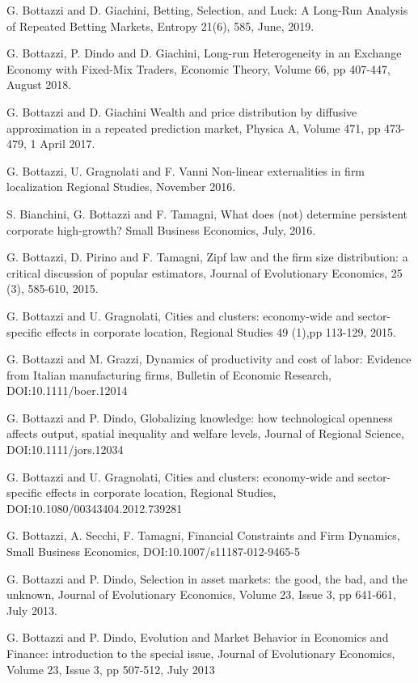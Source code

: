 \documentclass[a4paper]{article}
\begin{document}
G. Bottazzi and D. Giachini, Betting, Selection, and Luck: A Long-Run
Analysis of Repeated Betting Markets, Entropy 21(6), 585, June, 2019.

G. Bottazzi, P. Dindo and D. Giachini, Long-run Heterogeneity in an
Exchange Economy with Fixed-Mix Traders, Economic Theory, Volume 66,
pp 407-447, August 2018.

G. Bottazzi and D. Giachini Wealth and price distribution by diffusive
approximation in a repeated prediction market, Physica A, Volume 471,
pp 473-479, 1 April 2017.

G. Bottazzi, U. Gragnolati and F. Vanni Non-linear externalities in
firm localization Regional Studies, November 2016.

S. Bianchini, G. Bottazzi and F. Tamagni, What does (not) determine
persistent corporate high-growth? Small Business Economics,
July, 2016.

G. Bottazzi, D. Pirino and F. Tamagni, Zipf law and the firm size
distribution: a critical discussion of popular estimators, Journal of
Evolutionary Economics, 25 (3), 585-610, 2015.

G. Bottazzi and U. Gragnolati, Cities and clusters: economy-wide and
sector-specific effects in corporate location, Regional Studies 49
(1),pp 113-129, 2015.

G. Bottazzi and M. Grazzi, Dynamics of productivity and cost of labor:
Evidence from Italian manufacturing firms, Bulletin of Economic
Research, DOI:10.1111/boer.12014

G. Bottazzi and P. Dindo, Globalizing knowledge: how technological
openness affects output, spatial inequality and welfare levels,
Journal of Regional Science, DOI:10.1111/jors.12034

G. Bottazzi and U. Gragnolati, Cities and clusters: economy-wide and
sector-specific effects in corporate location, Regional Studies,
DOI:10.1080/00343404.2012.739281

G. Bottazzi, A. Secchi, F. Tamagni, Financial Constraints and Firm
Dynamics, Small Business Economics, DOI:10.1007/s11187-012-9465-5

G. Bottazzi and P. Dindo, Selection in asset markets: the good, the
bad, and the unknown, Journal of Evolutionary Economics, Volume 23,
Issue 3, pp 641-661, July 2013.

G. Bottazzi and P. Dindo, Evolution and Market Behavior in Economics
and Finance: introduction to the special issue, Journal of
Evolutionary Economics, Volume 23, Issue 3, pp 507-512, July 2013
\end{document}

